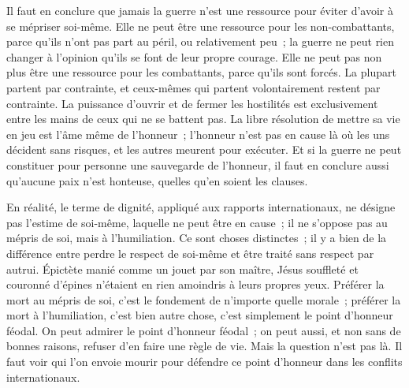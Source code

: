 \documentclass[french,twoside]{book} %
\begin{document}
Il faut en conclure que jamais la guerre n'est une ressource pour éviter d'avoir à se mépriser soi-même. Elle ne peut être une ressource pour les non-combattants, parce qu'ils n'ont pas part au péril, ou relativement peu ; la guerre ne peut rien changer à l'opinion qu'ils se font de leur propre courage. Elle ne peut pas non plus être une ressource pour les combattants, parce qu'ils sont forcés. La plupart partent par contrainte, et ceux-mêmes qui partent volontai­rement restent par contrainte. La puissance d'ouvrir et de fermer les hostilités est exclusivement entre les mains de ceux qui ne se battent pas. La libre résolution de mettre sa vie en jeu est l'âme même de l'honneur ; l'honneur n'est pas en cause là où les uns décident sans risques, et les autres meurent pour exécuter. Et si la guerre ne peut constituer pour personne une sauvegarde de l'honneur, il faut en conclure aussi qu'aucune paix n'est honteuse, quelles qu'en soient les clauses.\par
En réalité, le terme de dignité, appliqué aux rapports internationaux, ne désigne pas l'estime de soi-même, laquelle ne peut être en cause ; il ne s'oppose pas au mépris de soi, mais à l'humiliation. Ce sont choses distinctes ; il y a bien de la différence entre perdre le respect de soi-même et être traité sans respect par autrui. Épictète manié comme un jouet par son maître, Jésus souffleté et couronné d'épines n'étaient en rien amoindris à leurs propres yeux. Préférer la mort au mépris de soi, c'est le fondement de n'importe quelle mora­le ; préférer la mort à l'humiliation, c'est bien autre chose, c'est simplement le point d'honneur féodal. On peut admirer le point d'honneur féodal ; on peut aussi, et non sans de bonnes raisons, refuser d'en faire une règle de vie. Mais la question n'est pas là. Il faut voir qui l'on envoie mourir pour défendre ce point d'honneur dans les conflits internationaux.\par
\end{document}
